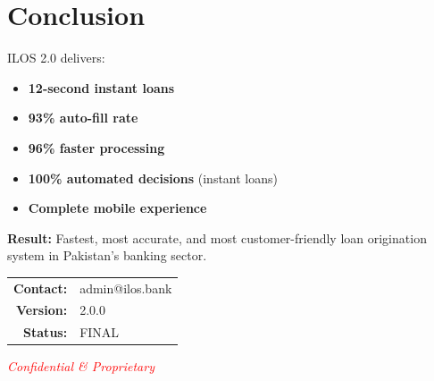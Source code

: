 \documentclass[11pt,a4paper]{article}
\begin{document}
\section*{Conclusion}

ILOS 2.0 delivers:

\begin{tcolorbox}[colback=codecolor,colframe=tealcolor,arc=2mm]
\begin{itemize}[leftmargin=*,noitemsep]
    \item \textbf{12-second instant loans}
    \item \textbf{93\% auto-fill rate}
    \item \textbf{96\% faster processing}
    \item \textbf{100\% automated decisions} (instant loans)
    \item \textbf{Complete mobile experience}
\end{itemize}
\end{tcolorbox}

\vspace{1cm}

\textbf{Result:} Fastest, most accurate, and most customer-friendly loan origination system in Pakistan's banking sector.

\vspace{2cm}

\begin{center}
\begin{tabular}{rl}
\textbf{Contact:} & admin@ilos.bank \\
\textbf{Version:} & 2.0.0 \\
\textbf{Status:} & FINAL \\
\end{tabular}

\vspace{1cm}

\textcolor{red}{\textit{Confidential \& Proprietary}}
\end{center}
\end{document}
